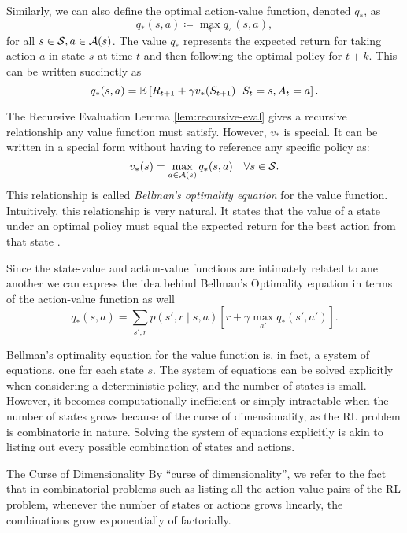 Similarly, we can also define the optimal action-value function, denoted $q_*$, as
\begin{equation*}
	q_* (s, a) \coloneqq \max_{\pi} q_\pi (s, a),
\end{equation*}
for all $s \in \mathcal{S}, a \in \mathcal{A}(s)$. The value $q_*$ represents the
expected return for taking action $a$ in state $s$ at time $t$ and then
following the optimal policy for $t+k$. This can be written succinctly as
\begin{equation*}
	q_{*} (s, a) = \mathbb{E} \left[ R_{t+1} + \gamma v_* (S_{t+1}) \,\middle\vert\, S_t = s, A_t = a \right].
\end{equation*}

The Recursive Evaluation Lemma \ref{lem:recursive-eval} gives a recursive
relationship any value function must satisfy. However, $v_*$ is special. It can
be written in a special form \cite{bellman1957,SuttonBarto,raoRL4F} without
having to reference any specific policy as:
\begin{equation}
	\label{eq:prop-dependencia-vq}
	v_* (s) = \max_{a \in \mathcal{A}(s)} q_* (s, a) \quad \forall s \in \mathcal{S}.
\end{equation}
This relationship is called \textit{Bellman's optimality equation} for the value
function. Intuitively, this relationship is very natural. It states that the
value of a state under an optimal policy must equal the expected return for the
best action from that state \cite[Ch.~3.6]{SuttonBarto}.

Since the state-value and action-value functions are intimately related to ane
another we can express the idea behind Bellman's Optimality equation in terms of
the action-value function as well
\begin{equation*}
	q_* (s, a) = \sum_{s', r} p(s', r \mid s, a) \left[ r + \gamma \max_{a'} q_{*} (s', a') \right].
\end{equation*}

Bellman's optimality equation for the value function is, in fact, a system of
equations, one for each state $s$. The system of equations can be solved
explicitly when considering a deterministic policy, and the number of states is
small. However, it becomes computationally inefficient or simply intractable
when the number of states grows because of the curse of dimensionality, as the
RL problem is combinatoric in nature. Solving the system of equations explicitly
is akin to listing out every possible combination of states and actions.

\begin{remark}{The Curse of Dimensionality}
	By ``curse of dimensionality'', we refer to the fact that in combinatorial
	problems such as listing all the action-value pairs of the RL problem,
	whenever the number of states or actions grows linearly, the combinations
	grow exponentially of factorially.
\end{remark}

